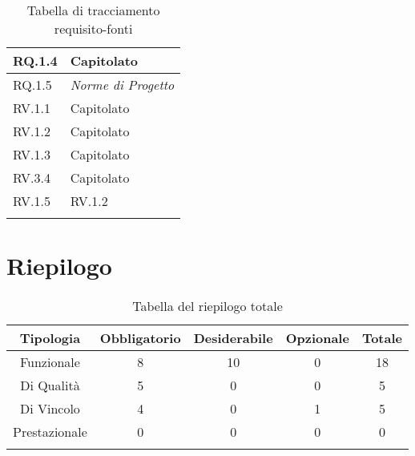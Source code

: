 \begin{center}
\begin{longtable}{|C{6cm}|C{6cm}|}
    RQ.1.4 & Capitolato \\ \hline
    RQ.1.5 & \textit{Norme di Progetto} \\ \hline
    RV.1.1 & Capitolato \\ \hline
    RV.1.2 & Capitolato \\ \hline
    RV.1.3 & Capitolato \\ \hline
    RV.3.4 & Capitolato \\ \hline
    RV.1.5 & RV.1.2 \\ \hline

    \caption{Tabella di tracciamento requisito-fonti}
  \end{longtable}
\end{center}


\section{Riepilogo}

\begin{center}
  \centering
  \begin{longtable}{|c|c|c|c|c|}
    \hline
    \rowcolor[HTML]{036400}
    {\color[HTML]{FFFFFF} \textbf{Tipologia}} & {\color[HTML]{FFFFFF} \textbf{Obbligatorio}} & {\color[HTML]{FFFFFF} \textbf{Desiderabile}} & {\color[HTML]{FFFFFF} \textbf{Opzionale}}  & {\color[HTML]{FFFFFF} \textbf{Totale}} \\ \hline
    \rowcolor[HTML]{EFEFEF}
    Funzionale & 8 & 10 & 0 & 18 \\ \hline
    \rowcolor[HTML]{C0C0C0}
    Di Qualità & 5 & 0 & 0 & 5 \\ \hline
    \rowcolor[HTML]{EFEFEF}
    Di Vincolo & 4 & 0 & 1 & 5 \\ \hline
    \rowcolor[HTML]{C0C0C0}
    Prestazionale & 0 & 0 & 0 & 0 \\ \hline

    \caption{Tabella del riepilogo totale}
  \end{longtable}
\end{center}
